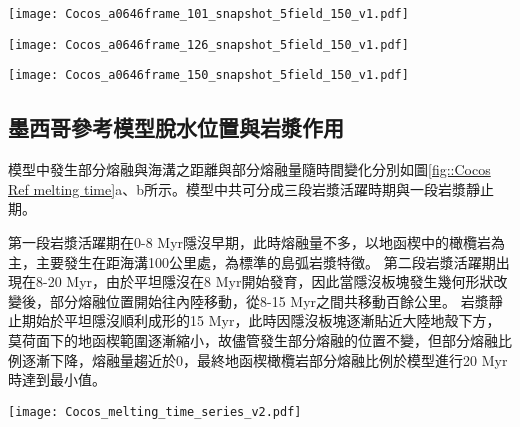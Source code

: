 \begin{figure*}[htp]
    \centering
    \texttt{[image: Cocos\_a0646frame\_101\_snapshot\_5field\_150\_v1.pdf]}
    \caption[墨西哥參考模型於20 Myr時之結果]{墨西哥參考模型於20 Myr時之結果。}
    \label{fig::Ref Cocos 101}
\end{figure*}

\begin{figure*}[htp]
    \centering
    \texttt{[image: Cocos\_a0646frame\_126\_snapshot\_5field\_150\_v1.pdf]}
    \caption[墨西哥參考模型於25 Myr時之結果]{墨西哥參考模型於25 Myr時之結果。}
    \label{fig::Ref Cocos 126}
\end{figure*}

\begin{figure*}[htp]
    \centering
    \texttt{[image: Cocos\_a0646frame\_150\_snapshot\_5field\_150\_v1.pdf]}
    \caption[墨西哥參考模型於30 Myr時之結果]{墨西哥參考模型於30 Myr時之結果。}
    \label{fig::Ref Cocos 150}
\end{figure*}

\newpage
\subsection{墨西哥參考模型脫水位置與岩漿作用}
模型中發生部分熔融與海溝之距離與部分熔融量隨時間變化分別如圖\ref{fig::Cocos Ref melting time}a、b所示。模型中共可分成三段岩漿活躍時期與一段岩漿靜止期。

第一段岩漿活躍期在0-8 Myr隱沒早期，此時熔融量不多，以地函楔中的橄欖岩為主，主要發生在距海溝100公里處，為標準的島弧岩漿特徵。
第二段岩漿活躍期出現在8-20 Myr，由於平坦隱沒在8 Myr開始發育，因此當隱沒板塊發生幾何形狀改變後，部分熔融位置開始往內陸移動，從8-15 Myr之間共移動百餘公里。
岩漿靜止期始於平坦隱沒順利成形的15 Myr，此時因隱沒板塊逐漸貼近大陸地殼下方，莫荷面下的地函楔範圍逐漸縮小，故儘管發生部分熔融的位置不變，但部分熔融比例逐漸下降，熔融量趨近於0，最終地函楔橄欖岩部分熔融比例於模型進行20 Myr時達到最小值。
\begin{figure*}[h]
    \centering
    \texttt{[image: Cocos\_melting\_time\_series\_v2.pdf]}
    \caption[墨西哥參考模型岩漿作用隨時間變化]{墨西哥參考模型岩漿作用隨時間變化，灰色底標出平坦隱沒發育後時間段。(a)部分熔融與海溝之距離隨時間變化圖，縱軸中每個點代表每次部分熔融發生位置，顏色為指數上的部分熔融比例。(b)岩石熔融量隨時間變化圖，熔融量單位為每單位海溝產生之立方公里量中每20萬年瞬時量。顏色代表不同岩相。}
    \label{fig::Cocos Ref melting time}
\end{figure*}

